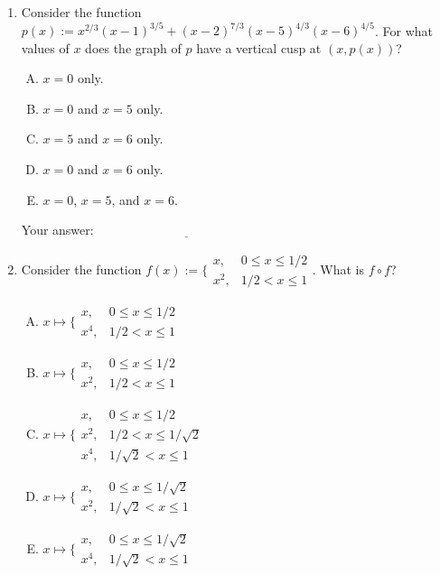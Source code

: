 \documentclass[10pt]{amsart}
\begin{document}
\begin{enumerate}
\item Consider the function $p(x) := x^{2/3}(x - 1)^{3/5} +
  (x-2)^{7/3}(x - 5)^{4/3}(x - 6)^{4/5}$. For what values of $x$ does
  the graph of $p$ have a vertical cusp at $(x,p(x))$?

  \begin{enumerate}[(A)]
  \item $x = 0$ only.
  \item $x = 0$ and $x = 5$ only.
  \item $x = 5$ and $x = 6$ only.
  \item $x = 0$ and $x = 6$ only.
  \item $x = 0$, $x = 5$, and $x = 6$.
  \end{enumerate}

  \vspace{0.1in}
  Your answer: $\underline{\qquad\qquad\qquad\qquad\qquad\qquad\qquad}$
  \vspace{0.6in}

\item Consider the function $f(x) := \lbrace\begin{array}{rl}x, & 0
  \le x \le 1/2 \\ x^2, & 1/2 < x \le 1\end{array}$. What is $f \circ f$?

  \begin{enumerate}[(A)]
  \item $x \mapsto \lbrace\begin{array}{rl} x, & 0 \le x \le 1/2\\ x^4, & 1/2 < x \le 1\end{array}$
  \item $x \mapsto \lbrace\begin{array}{rl} x, & 0 \le x \le 1/2\\ x^2, & 1/2 < x \le 1\end{array}$
  \item $x \mapsto \lbrace\begin{array}{rl} x, & 0 \le x \le 1/2\\ x^2, & 1/2 < x \le 1/\sqrt{2}\\ x^4, & 1/\sqrt{2} < x \le 1\end{array}$
  \item $x \mapsto \lbrace \begin{array}{rl} x, & 0 \le x \le 1/\sqrt{2}\\ x^2,& 1/\sqrt{2} < x \le 1\end{array}$
  \item $x \mapsto \lbrace\begin{array}{rl} x, & 0 \le x \le 1/\sqrt{2}\\ x^4, &1/\sqrt{2} < x \le 1\end{array}$
  \end{enumerate}


\end{enumerate}
\end{document}
